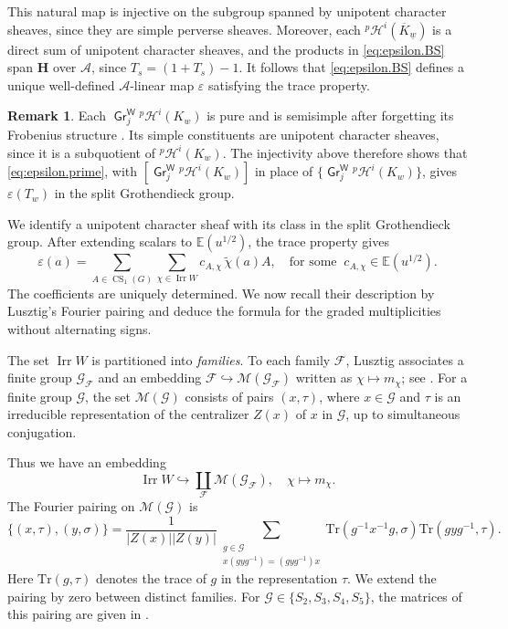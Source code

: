 \documentclass[11pt]{amsart}
\numberwithin{equation}{section}
\theoremstyle{definition}
\newtheorem{remark}[theorem]{Remark}
\newcommand\hecke{\mathbf{H}}  %
\DeclareMathOperator{\Irr}{\mathrm{Irr}}
\DeclareMathOperator{\CS}{\mathrm{CS}}
\DeclareMathOperator{\Gr}{\mathsf{Gr}}
\DeclareMathOperator{\W}{\mathsf{W}}
\def\cA{\mathcal {A}}
\def\cH{\mathcal {H}}
\def\Tr{\mathrm {Tr}}
\def\EE{\mathbb{E}}
\begin{document}
This natural map is injective on the subgroup spanned by unipotent character sheaves, since they are simple perverse sheaves.
Moreover, each ${}^p\cH^i(\overline K_{\underline w})$ is a direct sum of unipotent character sheaves, and the products in \eqref{eq:epsilon.BS} span $\hecke$ over $\cA$, since $T_s=(1+T_s)-1$. %
It follows that \eqref{eq:epsilon.BS} defines a unique well-defined
$\cA$-linear map $\varepsilon$ satisfying the trace property.

\begin{remark}
Each $\Gr^{\W}_j{}^p\cH^i(K_w)$ is pure and is semisimple after forgetting its Frobenius structure \cite[Theorem~5.3.8]{BBD}.
Its simple constituents are unipotent character sheaves, since it is a subquotient of ${}^p\cH^i(K_w)$.
The injectivity above therefore shows that \eqref{eq:epsilon.prime}, with $[\Gr^{\W}_j{}^p\cH^i(K_w)]$ in place of $\{\Gr^{\W}_j{}^p\cH^i(K_w)\}$, gives $\varepsilon(T_w)$ in the split Grothendieck group.
\end{remark}


We identify a unipotent character sheaf with its class in the split Grothendieck group.
After extending scalars to $\EE(u^{1/2})$, the trace property gives %
\[
\varepsilon(a)
=\sum_{A\in\CS_1(G)}\sum_{\chi\in\Irr W}
c_{A,\chi}\,\widetilde\chi(a)A,
\quad\text{for some }~ c_{A,\chi}\in\EE(u^{1/2}).
\]
The coefficients are uniquely determined.
We now recall their description by Lusztig's Fourier pairing and deduce the formula for the graded multiplicities without alternating signs.

The set $\Irr W$ is partitioned into \emph{families}.
To each family $\mathscr F$, Lusztig associates a finite group $\mathscr G_{\mathscr F}$ and an embedding $\mathscr F\hookrightarrow\mathscr M(\mathscr G_{\mathscr F})$  written as $\chi\mapsto m_{\chi}$; see \cite[Chapter~4]{Lus84}.
For a finite group $\mathscr G$, the set $\mathscr M(\mathscr G)$ consists of pairs $(x,\tau)$, where $x\in\mathscr G$ and $\tau$ is an irreducible representation of the centralizer $Z(x)$ of $x$ in $\mathscr G$, up to simultaneous conjugation.

Thus we have an embedding
\begin{equation}\label{eq:family.IrrW}
\Irr W\hookrightarrow
\coprod_{\mathscr F}\mathscr M(\mathscr G_{\mathscr F}),
\quad \chi\mapsto m_\chi.
\end{equation}
The Fourier pairing on $\mathscr M(\mathscr G)$ is
\[
\{(x,\tau),(y,\sigma)\}
=\frac{1}{|Z(x)||Z(y)|}
\sum_{\substack{g\in\mathscr G\\
x(gyg^{-1})=(gyg^{-1})x}}
\Tr(g^{-1}x^{-1}g,\sigma)\Tr(gyg^{-1},\tau).
\]
Here $\Tr(g,\tau)$ denotes the trace of $g$ in the representation $\tau$.
We extend the pairing by zero between distinct families.
For $\mathscr G\in\{S_2,S_3,S_4,S_5\}$, the matrices of this pairing are given in \cite[Section~4.15]{Lus84}.
\end{document}
